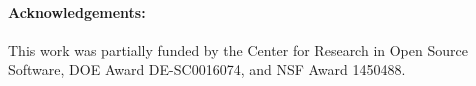 %
%

\paragraph*{Acknowledgements:} This work was partially funded by the Center for Research in Open Source Software, DOE Award DE-SC0016074, and NSF Award 1450488.